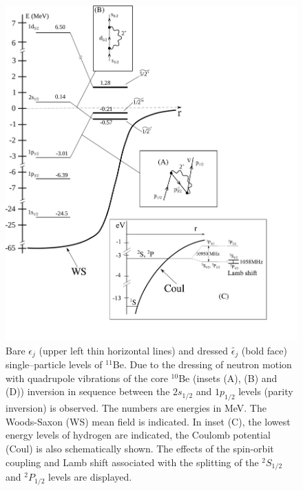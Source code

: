    \begin{figure}
   \centerline{\includegraphics*[width=12cm,angle=0]{C8/figsC8/Fig6_2_1}}
   	\caption{Bare $\epsilon_j$ (upper left  thin horizontal lines) and dressed $\tilde{\epsilon_j}$ (bold face)
   	single--particle levels of $^{11}$Be. Due to the dressing of neutron motion with  quadrupole vibrations
   	of the core $^{10}$Be (insets (A), (B) and (D)) inversion in sequence between the 
   	$ 2s_{1/2}$ and $ 1p_{1/2}$ levels  (parity inversion) is observed. The numbers 
   	are   energies in MeV. The Woods-Saxon (WS) mean field is indicated.
   	In inset (C), the lowest energy levels of hydrogen 
   	are indicated, the Coulomb potential (Coul) is also schematically shown.
   	The effects of the spin-orbit coupling and Lamb shift associated with the splitting of the 
   	$^2S_{1/2}$ and $^2P_{1/2}$ levels are displayed.}\label{fig6.2.1x}
   \end{figure} 
